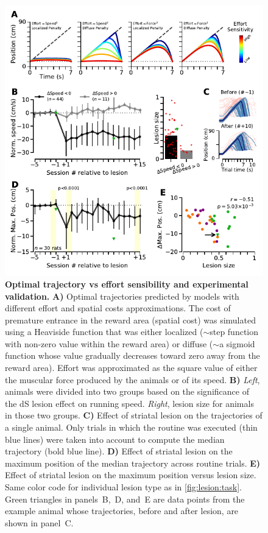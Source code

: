 \begin{figure}[bth!]
	\begin{center}
		\includegraphics[scale=1]{ch-lesion/figures/MaxPosAnalysis.pdf}
		\caption
		{\textbf{Optimal trajectory vs effort sensibility and experimental validation.}
		\textbf{A)} Optimal trajectories predicted by models with different effort and spatial costs approximations.
		The cost of premature entrance in the reward area (spatial cost) was simulated using a Heaviside function that was either localized ($\sim$step function with non-zero value within the reward area) or diffuse ($\sim$a sigmoid function whose value gradually decreases toward zero away from the reward area).
		Effort was approximated as the square value of either the muscular force produced by the animals or of its speed.
		\textbf{B)} \textit{Left}, animals were divided into two groups based on the significance of the dS lesion effect on running speed.
		\textit{Right}, lesion size for animals in those two groups.
		\textbf{C)} Effect of striatal lesion on the trajectories of a single animal.
		Only trials in which the routine was executed (thin blue lines) were taken into account to compute the median trajectory (bold blue line).
		\textbf{D)} Effect of striatal lesion on the maximum position of the median trajectory across routine trials.
		\textbf{E)} Effect of striatal lesion on the maximum position versus lesion size.
		Same color code for individual lesion type as in \autoref{fig:lesion:task}.
		Green triangles in panels~B,~D, and~E are data points from the example animal whose trajectories, before and after lesion, are shown in panel~C.
		}
		\label{fig:lesion:maxPos}
	\end{center}
\end{figure}